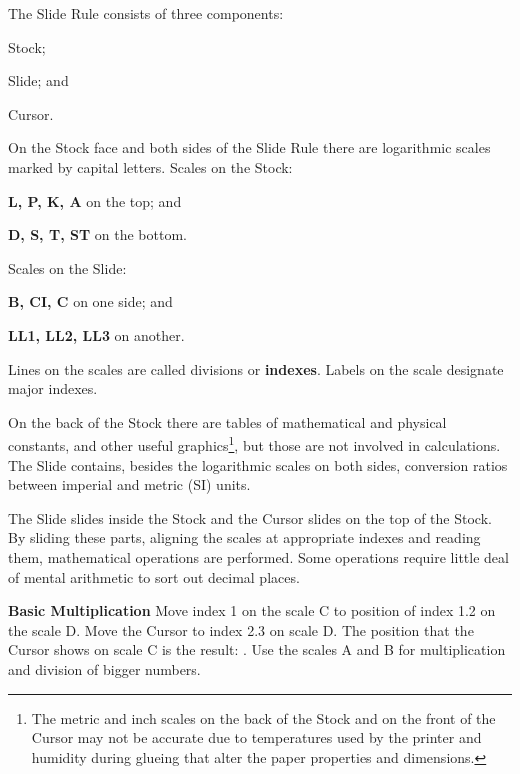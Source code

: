   \begin{multicols*}{3}
  \normalsize{
  The Slide Rule consists of three components:
    \begin{inparaenum}[a\upshape)]
      \item Stock;
      \item Slide; and
      \item Cursor.
    \end{inparaenum}

  On the Stock face and both sides of the Slide Rule there are logarithmic scales marked by capital letters. Scales on the Stock:
  \begin{inparaenum}[a\upshape)]
    \item \textbf{L, P, K, A} on the top; and
    \item \textbf{D, S, T, ST} on the bottom.
  \end{inparaenum}
  Scales on the Slide:
  \begin{inparaenum}[a\upshape)]
    \item \textbf{B, CI, C} on one side; and
    \item \textbf{LL1, LL2, LL3} on another.
  \end{inparaenum}

  Lines on the scales are called divisions or \textbf{indexes}. Labels on the scale designate major indexes.

  On the back of the Stock there are tables of mathematical and physical constants, and other useful graphics\footnote{The metric and inch scales on the back of the Stock and on the front of the Cursor may not be accurate due to temperatures used by the printer and humidity during glueing that alter the paper properties and dimensions.}, but those are not involved in calculations. The Slide contains, besides the logarithmic scales on both sides, conversion ratios between imperial and metric (SI) units.

  The Slide slides inside the Stock and the Cursor slides on the top of the Stock. By sliding these parts, aligning the scales at appropriate indexes and reading them, mathematical operations are performed. Some operations require little deal of mental arithmetic to sort out decimal places.

  \textbf{Basic Multiplication}
Move index 1 on the scale C to position of index 1.2 on the scale D.
Move the Cursor to index 2.3 on scale D.
The position that the Cursor shows on scale C is the result: .
\footnotesize Use the scales A and B for multiplication and division of bigger numbers.
\normalsize

}
\end{multicols*}
